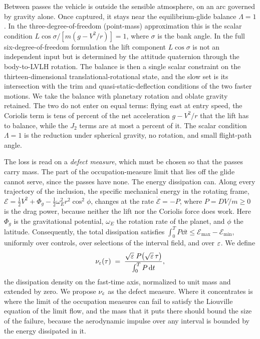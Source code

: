 \documentclass[english,11pt]{extarticle}
\begin{document}
Between passes the vehicle is outside the sensible atmosphere, on an arc
governed by gravity alone. Once captured, it stays near the
equilibrium-glide balance $\Lambda = 1$. In the three-degree-of-freedom
(point-mass) approximation this is the scalar condition
$L\cos\sigma/[m(g - V^2/r)] = 1$, where $\sigma$ is the bank angle. In the
full six-degree-of-freedom formulation the lift component $L\cos\sigma$ is
not an independent input but is determined by the attitude quaternion
through the body-to-LVLH rotation. The balance is then a single scalar
constraint on the thirteen-dimensional translational-rotational state, and
the slow set is its intersection with the trim and quasi-static-deflection
conditions of the two faster motions. We take the balance with planetary
rotation and oblate gravity retained. The two do not enter on equal terms:
flying east at entry speed, the Coriolis term is tens of percent of the net
acceleration $g - V^2/r$ that the lift has to balance, while the $J_2$ terms
are at most a percent of it. The scalar condition $\Lambda = 1$ is the
reduction under spherical gravity, no rotation, and small flight-path angle.

The loss is read on a \emph{defect measure}, which must be chosen so that
the passes carry mass. The part of the occupation-measure limit that lies
off the glide cannot serve, since the passes have none. The energy
dissipation can. Along every trajectory of the inclusion, the specific
mechanical energy in the rotating frame,
$\mathcal{E} = \tfrac12 V^2 + \Phi_g - \tfrac12\omega_E^2 r^2\cos^2\phi$,
changes at the rate $\dot{\mathcal{E}} = -P$, where $P = DV/m \ge 0$ is the
drag power, because neither the lift nor the Coriolis force does work. Here
$\Phi_g$ is the gravitational potential, $\omega_E$ the rotation rate of the
planet, and $\phi$ the latitude. Consequently, the total dissipation
satisfies $\int_0^T P\dd t \le \mathcal{E}_{\max} - \mathcal{E}_{\min}$,
uniformly over controls, over selections of the interval field, and over
$\varepsilon$. We define
\begin{equation}\label{eq:defect}
  \nu_\varepsilon(\tau)
  \;=\; \frac{\sqrt{\varepsilon}\;P\bigl(\sqrt{\varepsilon}\,\tau\bigr)}
             {\int_0^T P\,\mathrm{d} t} ,
\end{equation}
the dissipation density on the fast-time axis, normalized to unit mass and
extended by zero. We propose $\nu_\varepsilon$ as the defect measure. Where it
concentrates is where the limit of the occupation measures can fail to
satisfy the Liouville equation of the limit flow, and the mass that it puts
there should bound the size of the failure, because the aerodynamic impulse
over any interval is bounded by the energy dissipated in it.
\end{document}

